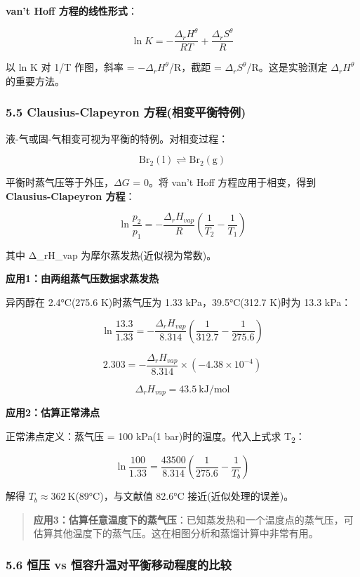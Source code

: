 \textbf{van't Hoff 方程的线性形式}：

\[
\ln K = -\frac{\Delta_r H^\theta}{RT} + \frac{\Delta_r S^\theta}{R}
\]

以 ln K 对 1/T 作图，斜率 = −\(\Delta_r H^\theta\)/R，截距 = \(\Delta_r S^\theta\)/R。这是实验测定 \(\Delta_r H^\theta\) 的重要方法。

\subsubsection{5.5 Clausius-Clapeyron 方程(相变平衡特例)}\label{clausius-clapeyron-ux65b9ux7a0bux76f8ux53d8ux5e73ux8861ux7279ux4f8b}

液-气或固-气相变可视为平衡的特例。对相变过程：

\[
\mathrm{Br_2(l) \rightleftharpoons Br_2(g)}
\]

平衡时蒸气压等于外压，\(\Delta G\) = 0。将 van't Hoff 方程应用于相变，得到 \textbf{Clausius-Clapeyron 方程}：

\[
\boxed{\ln\frac{p_2}{p_1} = -\frac{\Delta_r H_{vap}}{R}\left(\frac{1}{T_2} - \frac{1}{T_1}\right)}
\]

其中 Δ\_rH\_vap 为摩尔蒸发热(近似视为常数)。

\textbf{应用1：由两组蒸气压数据求蒸发热}

异丙醇在 2.4°C(275.6 K)时蒸气压为 1.33 kPa，39.5°C(312.7 K)时为 13.3 kPa：

\[
\ln\frac{13.3}{1.33} = -\frac{\Delta_r H_{vap}}{8.314}\left(\frac{1}{312.7} - \frac{1}{275.6}\right)
\]

\[
2.303 = -\frac{\Delta_r H_{vap}}{8.314} \times (-4.38 \times 10^{-4})
\]

\[
\Delta_r H_{vap} = 43.5\ \mathrm{kJ/mol}
\]

\textbf{应用2：估算正常沸点}

正常沸点定义：蒸气压 = 100 kPa(1 bar)时的温度。代入上式求 T\textsubscript{2}：

\[
\ln\frac{100}{1.33} = \frac{43500}{8.314}\left(\frac{1}{275.6} - \frac{1}{T_b}\right)
\]

解得 \(T_b \approx 362\ \mathrm{K}\)(89°C)，与文献值 82.6°C 接近(近似处理的误差)。

\begin{quote}
\textbf{应用3：估算任意温度下的蒸气压}：已知蒸发热和一个温度点的蒸气压，可估算其他温度下的蒸气压。这在相图分析和蒸馏计算中非常有用。
\end{quote}

\subsubsection{5.6 恒压 vs 恒容升温对平衡移动程度的比较}\label{ux6052ux538b-vs-ux6052ux5bb9ux5347ux6e29ux5bf9ux5e73ux8861ux79fbux52a8ux7a0bux5ea6ux7684ux6bd4ux8f83}

